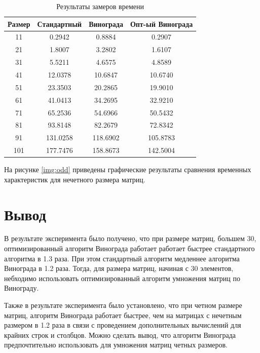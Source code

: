 \begin{table}[h]
    \begin{center}
        \begin{threeparttable}
        \captionsetup{justification=raggedright,singlelinecheck=off}
        \caption{Результаты замеров времени}
        \label{tbl:time_odd}
        \begin{tabular}{|c|c|c|c|}
            \hline
            Размер & Стандартный & Винограда & Опт-ый Винограда  \\
            \hline
			11 & 0.2942 & 0.8884 & 0.2907 \\
			\hline
			21 & 1.8007 & 3.2802 & 1.6107 \\
			\hline
			31 & 5.5211 & 4.6575 & 4.8589 \\
			\hline
			41 & 12.0378 & 10.6847 & 10.6740 \\
			\hline
			51 & 23.3503 & 20.2865 & 19.9010 \\
			\hline
			61 & 41.0413 & 34.2695 & 32.9210 \\
			\hline
			71 & 65.2536 & 54.6966 & 50.5432 \\
			\hline
			81 & 93.8148 & 82.2679 & 72.8342 \\
			\hline
			91 & 131.0258 & 118.6902 & 105.8783 \\
			\hline
			101 & 177.7476 & 158.8673 & 142.5004 \\
			\hline
		\end{tabular}
    \end{threeparttable}
\end{center}
\end{table}

На рисунке \ref{img:odd} приведены графические результаты сравнения временных характеристик для нечетного размера матриц.

\section{Вывод}

В результате эксперимента было получено, что при размере матриц, большем 30, оптимизированный алгоритм Винограда работает работает быстрее стандартного алгоритма в 1.3 раза. При этом стандартный алгоритм медленнее алгоритма Винограда в 1.2 раза. Тогда, для размера матриц, начиная с 30 элементов, небходимо использовать оптимизированный алгоритм умножения матриц по Винограду.

Также в результате эксперимента было установлено, что при четном размере матриц, алгоритм Винограда работает быстрее, чем на матрицах с нечетным размером в 1.2 раза в связи с проведением дополнительных вычислений для крайних строк и столбцов. Можно сделать вывод, что алгоритм Винограда предпочтительно использовать для умножения матриц четных размеров.